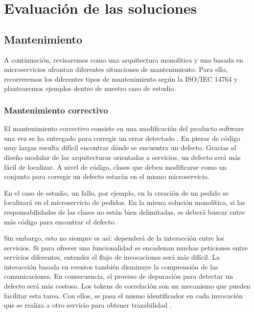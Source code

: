 \documentclass[11pt,spanish,listoffigures]{tfgetsinf}
\begin{document}
%

\chapter{Evaluación de las soluciones}

\section{Mantenimiento} \label{sect:Mantenimiento}

A continuación, revisaremos como una arquitectura monolítica y una basada en microservicios afrontan diferentes situaciones de mantenimiento. Para ello, recorreremos los diferentes tipos de mantenimiento según la ISO/IEC 14764 y plantearemos ejemplos dentro de nuestro caso de estudio. 

\subsection{Mantenimiento correctivo}

El mantenimiento correctivo consiste en una modificación del producto software una vez se ha entregado para corregir un error detectado \cite{Bourque2014}. En piezas de código muy largas resulta difícil encontrar dónde se encuentra un defecto. Gracias al diseño modular de las arquitecturas orientadas a servicios, un defecto será más fácil de localizar. A nivel de código, clases que deben modificarse como un conjunto para corregir un defecto estarán en el mismo microservicio.

En el caso de estudio, un fallo, por ejemplo, en la creación de un pedido se localizará en el microservicio de pedidos. En la misma solución monolítica, si las responsabilidades de las clases no están bien delimitadas, se deberá buscar entre más código para encontrar el defecto.

Sin embargo, esto no siempre es así: dependerá de la interacción entre los servicios. Si para ofrecer una funcionalidad se encadenan muchas peticiones entre servicios diferentes, entender el flujo de invocaciones será más difícil. La interacción basada en eventos también disminuye la comprensión de las comunicaciones. En consecuencia, el proceso de depuración para detectar un defecto será más costoso. Los tokens de correlación son un mecanismo que pueden facilitar esta tarea. Con ellos, se pasa el mismo identificador en cada invocación que se realiza a otro servicio para obtener trazabilidad \cite{Baum2016}.
\end{document}
